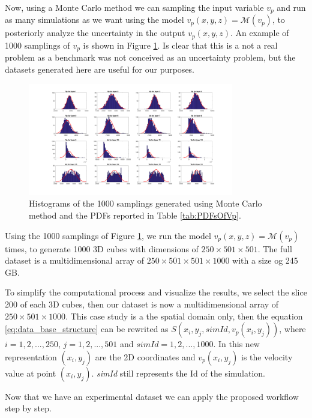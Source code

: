 Now, using a Monte Carlo method we can sampling the input variable $v_{p}$ and run as many simulations as we want using the model $v_{p}(x,y,z) = \mathcal{M}(v_{p})$, to posteriorly analyze the uncertainty in the output $v_{p}(x,y,z)$. An example of 1000 samplings of $v_{p}$ is shown in Figure \ref{fig:vp_1000_realizations}. Is clear that this is a not a real problem as a benchmark was not conceived as an uncertainty problem, but the datasets generated here are useful for our purposes.

\begin{figure}[ht]
    \centering
    \includegraphics[width=0.8\textwidth]{images/vp_1000_realizations.png}
    \caption{Histograms of the 1000 samplings generated using Monte Carlo method and the PDFs reported in Table \ref{tab:PDFsOfVp}.}
    \label{fig:vp_1000_realizations}
\end{figure}

Using the 1000 samplings of Figure \ref{fig:vp_1000_realizations}, we run the model $v_{p}(x,y,z) = \mathcal{M}(v_{p})$ times, to generate 1000 3D cubes with dimensions of $250\times501\times501$. The full dataset is a multidimensional array of $250\times501\times501\times1000$ with a size og 245 GB. 

To simplify the computational process and visualize the results, we select the slice 200 of each 3D cubes, then our dataset is now a multidimensional array of $250\times501\times1000$. This case study is a the spatial domain only, then the equation \ref{eq:data_base_structure} can be rewrited as $S(x_{i},y_{j},simId,v_{p}(x_{i},y_{j}))$, where $i=1, 2,...,250$, $j=1, 2,...,501$ and $simId = 1, 2,...,1000$. In this new representation $(x_{i},y_{j})$ are the 2D coordinates and $v_{p}(x_{i},y_{j})$ is the velocity value at point $(x_{i},y_{j})$. \textit{simId} still represents the Id of the simulation.

Now that we have an experimental dataset we can apply the proposed workflow step by step.

